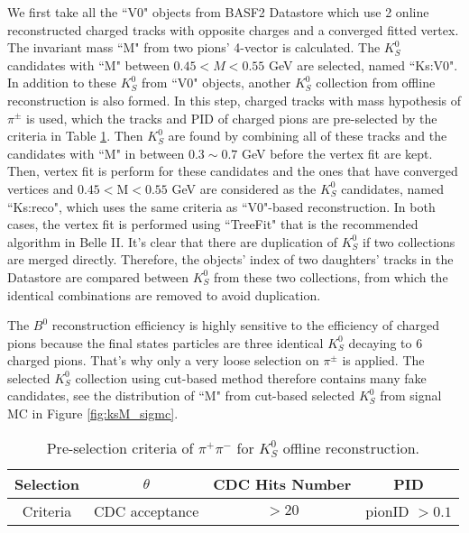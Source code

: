   We first take all the ``V0" objects from BASF2 Datastore which use 2 online reconstructed charged tracks with opposite charges and a converged fitted vertex. The invariant mass ``M" from two pions' 4-vector is calculated. The $K_S^0$ candidates with ``M" between $0.45 < M < 0.55$ GeV are selected, named ``Ks:V0". In addition to these $K_S^0$ from ``V0" objects, another $K_S^0$ collection from offline reconstruction is also formed. In this step, charged tracks with mass hypothesis of $\pi^{\pm}$ is used, which the tracks and PID of charged pions are pre-selected by the criteria in Table \ref{tab:kspipi_select}. Then $K_S^0$ are found by combining all of these tracks and the candidates with ``M" in between $0.3 \sim 0.7$ GeV before the vertex fit are kept. Then, vertex fit is perform for these candidates and the ones that have converged vertices and $0.45 < \text{M} < 0.55$ GeV are considered as the $K_S^0$ candidates, named ``Ks:reco", which uses the same criteria as ``V0"-based reconstruction. In both cases, the vertex fit is performed using ``TreeFit"\cite{krohn2020global} that is the recommended algorithm in Belle II. It's clear that there are duplication of $K_S^0$ if two collections are merged directly. Therefore, the objects' index of two daughters' tracks in the Datastore are compared between $K_S^0$ from these two collections, from which the identical combinations are removed to avoid duplication. 
  
  
   The $B^0$ reconstruction efficiency is highly sensitive to the efficiency of charged pions because the final states particles are three identical $K_S^0$ decaying to 6 charged pions. That's why only a very loose selection on $\pi^{\pm}$ is applied. The selected $K_S^0$ collection using cut-based method therefore contains many fake candidates, see the distribution of ``M" from cut-based selected $K_S^0$ from signal MC in Figure \ref{fig:ksM_sigmc}.
 
 
 \begin{table}[htbp]
 	\centering
 	\large
 	\caption{Pre-selection criteria of $\pi^+ \pi^-$ for $K_S^0$ offline reconstruction.}
 	\label{tab:kspipi_select}
 	\begin{tabular}{c c c c }
 		\toprule
 		Selection & $\theta$ & CDC Hits Number & PID  \\
 		\hline
 		Criteria  & CDC acceptance &  $>20$ & pionID $> 0.1$\\
 		\bottomrule
 	\end{tabular}
 \end{table}

